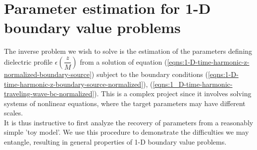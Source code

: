 \documentclass[12pt,twoside]{article}
\begin{document}
\begin{comment}
\section{Inverse problem for the 1-D one-way wave equation}

Hyperbolic PDE systems of the form (\ref{eqns:ourMaxwellEyHzPolarized}) and (\ref{eqns:ourMaxwellEzHyPolarized}) can be transformed into coupled 1-D one way wave equations
\begin{align*}
u^j_t+a^j(x)u^j_x=0, \qquad j=1,2
\end{align*}
where coupling occurs at the boundary. It therefore makes sense use parameter identification problems for END HERE 
\begin{align*}
\begin{cases}
u_t + a(x) u_x &= 0,	\qquad -L<x< \infty \\
u(x,0) &= 0	\\
u(-L,t) &= g(t)
\end{cases}
\end{align*}
Most of the time we shall be interested in a boundary condition of the form 
\begin{align}
g(t) = A e^{i \left(\omega t + \phi \right)}
\label{eqns:complexExpBC}
\end{align}
When $a(x)=a$ is constant, we have a traveling wave solution 
\begin{align*}
u(x,t) = u(x-at)
\end{align*}
as can be shown by direct differentiation. Applying the initial condition and the left boundary condition we get

\begin{align*}
u(x,t) = g\left( t-\dfrac{x+L}{a} \right)
\end{align*}
and for the boundary condition (\ref{eqns:complexExpBC}), we get
\begin{align}
u(x,t) =A e^{i \left(\omega  \left(t-\frac{x+L}{a}\right)+\phi \right)}
\end{align}

Now assume that
\end{comment} 

\section{Parameter estimation for 1-D boundary value problems}
The inverse problem we wish to solve is the estimation of the parameters defining dielectric profile $\epsilon\left(\dfrac{z}{M}\right)$ from a solution of equation (\ref{eqns:1-D-time-harmonic-z-normalized-boundary-source}) subject to the boundary conditions (\ref{eqns:1-D-time-harmonic-z-boundary-source-normalized}), (\ref{eqns:1_D-time-harmonic-traveling-wave-bc-normalized}). This is a complex project since it involves solving systems of nonlinear equations, where the target parameters may have different scales.\\
It is thus instructive to first analyze the recovery of parameters from  a reasonably simple 'toy model'. We use this procedure to demonstrate the difficulties we may entangle, resulting in general properties of 1-D boundary value problems.
\end{document}
